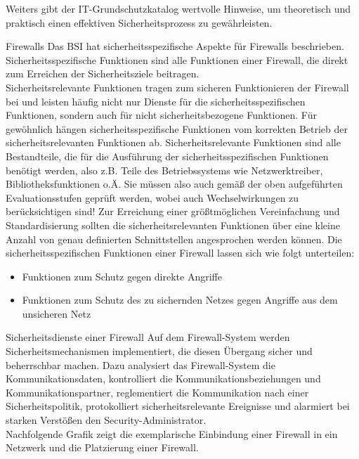  	Weiters gibt der IT-Grundschutzkatalog  wertvolle Hinweise, 
 	um theoretisch und praktisch einen effektiven Sicherheitsprozess zu gewährleisten.
 \DIFdelbegin %
\DIFdelend %

 \pagebreak
 \label{Firewalls}
 \begin{section}{Firewalls}
	Das BSI hat sicherheitsspezifische Aspekte für Firewalls beschrieben.
	Sicherheitsspezifische Funktionen sind alle Funktionen einer Firewall, 
	die direkt zum Erreichen der Sicherheitsziele beitragen. \\

	Sicherheitsrelevante Funktionen tragen zum sicheren Funktionieren der Firewall 
	bei und leisten häufig nicht nur Dienste für die sicherheitsspezifischen Funktionen, 
	sondern auch für nicht sicherheitsbezogene Funktionen. Für gewöhnlich hängen 
	sicherheitsspezifische Funktionen vom korrekten Betrieb der sicherheitsrelevanten Funktionen ab. 
	Sicherheitsrelevante Funktionen sind alle Bestandteile, die für die Ausführung der 
	sicherheitsspezifischen Funktionen benötigt werden, also z.B. 
	Teile des Betriebssystems wie Netzwerktreiber, Bibliotheksfunktionen o.Ä. 
	Sie müssen also auch gemäß der oben aufgeführten Evaluationsstufen geprüft werden, 
	wobei auch Wechselwirkungen zu berücksichtigen sind! 
	Zur Erreichung einer größtmöglichen Vereinfachung und Standardisierung sollten die 
	sicherheitsrelevanten Funktionen über eine kleine Anzahl von genau definierten Schnittstellen 
	angesprochen werden können.
	Die sicherheitsspezifischen Funktionen einer Firewall lassen sich wie folgt unterteilen:
	\begin{itemize}
		\item Funktionen zum Schutz gegen direkte Angriffe
		\item Funktionen zum Schutz des zu sichernden Netzes gegen Angriffe aus dem unsicheren Netz
	\end{itemize}
	\pagebreak

  \label{Sicherheitsdienste einer Firewall}
  \begin{subsection}{Sicherheitsdienste einer Firewall}
  	Auf dem Firewall-System werden Sicherheitsmechanismen implementiert, die diesen Übergang 
  	sicher und beherrschbar machen. Dazu analysiert das Firewall-System die Kommunikationsdaten, 
  	kontrolliert die Kommunikationsbeziehungen und Kommunikationspartner, 
  	reglementiert die Kommunikation nach einer Sicherheitspolitik, protokolliert sicherheitsrelevante 
  	Ereignisse und alarmiert bei starken Verstößen den Security-Administrator. \\
  	Nachfolgende Grafik zeigt die exemplarische Einbindung einer Firewall in ein Netzwerk und die Platzierung einer Firewall.
  	\DIFaddbegin 


\end{subsection}
\end{section}
